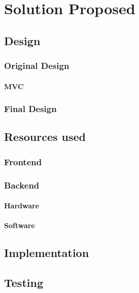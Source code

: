 \chapter{Solution Proposed}\label{chap:4}

\section{Design}\label{sec:chap4_des}

\subsection{Original Design}\label{sec:chap4_ori_des}

\subsubsection{MVC}\label{sec:chap4_ori_mvc}

\subsection{Final Design}\label{sec:chap4_fin_des}


\section{Resources used}\label{sec:chap4_res_used}

\subsection{Frontend}\label{sec:chap4_res_front}

\subsection{Backend}\label{sec:chap4_res_back}

\subsubsection{Hardware}\label{sec:chap4_back_hard}

\subsubsection{Software}\label{sec:chap4_back_soft}

\section{Implementation}\label{sec:chap4_impl}

\section{Testing}\label{sec:chap4_test}




